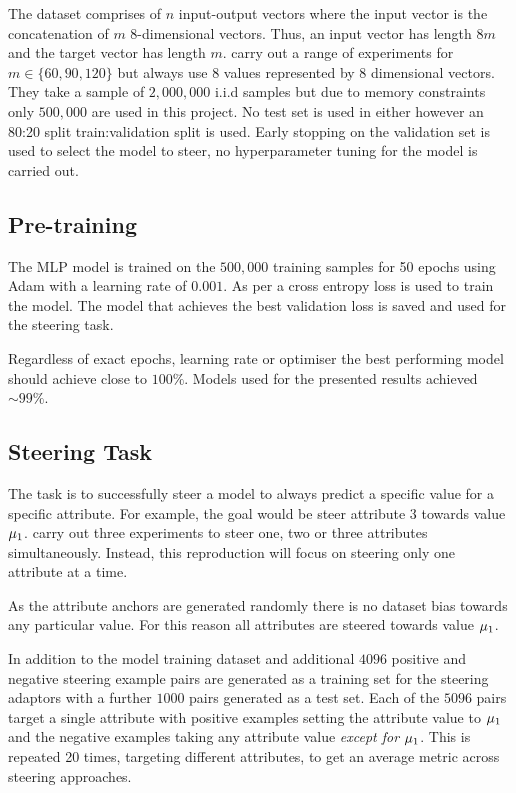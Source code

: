 The dataset comprises of $n$ input-output vectors where the input vector is the concatenation of $m$ 8-dimensional vectors.
Thus, an input vector has length $8m$ and the target vector has length $m$.
\citet{steering-clear} carry out a range of experiments for $m \in \{60, 90, 120\}$ but always use 8 values represented by 8 dimensional vectors.
They take a sample of $2,000,000$ i.i.d samples but due to memory constraints only $500,000$ are used in this project.
No test set is used in either however an 80:20 split train:validation split is used.
Early stopping on the validation set is used to select the model to steer, no hyperparameter tuning for the model is carried out.

\subsection{Pre-training}

The MLP model is trained on the $500,000$ training samples for 50 epochs using Adam \citep{adam} with a learning rate of $0.001$.
As per \citet{steering-clear} a cross entropy loss is used to train the model.
The model that achieves the best validation loss is saved and used for the steering task.

Regardless of exact epochs, learning rate or optimiser the best performing model should achieve close to $100\%$.
Models used for the presented results achieved $\sim 99\%$.

\subsection{Steering Task}

The task is to successfully steer a model to always predict a specific value for a specific attribute.
For example, the goal would be steer attribute $3$ towards value $\mathbf{\mu}_1$.
\citet{steering-clear} carry out three experiments to steer one, two or three attributes simultaneously.
Instead, this reproduction will focus on steering only one attribute at a time.

As the attribute anchors are generated randomly there is no dataset bias towards any particular value.
For this reason all attributes are steered towards value $\mathbf{\mu}_1$.

In addition to the model training dataset and additional $4096$ positive and negative steering example pairs are generated as a training set for the steering adaptors with a further $1000$ pairs generated as a test set.
Each of the $5096$ pairs target a single attribute with positive examples setting the attribute value to $\mathbf{\mu}_1$ and the negative examples taking any attribute value \emph{except for $\mathbf{\mu}_1$}.
This is repeated 20 times, targeting different attributes, to get an average metric across steering approaches.

